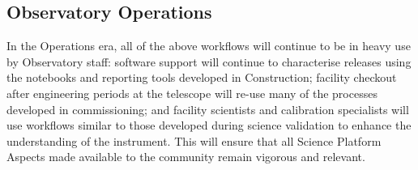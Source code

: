 \subsection{Observatory Operations}\label{observatory-operations}

In the Operations era, all of the above workflows will continue to be in heavy use by Observatory staff: software support will continue to characterise releases using the notebooks and reporting tools developed in Construction; facility checkout after engineering periods at the telescope will re-use many of the processes developed in commissioning; and facility scientists and calibration specialists will use workflows similar to those developed during science validation to enhance the understanding of the instrument. This will ensure that all Science Platform Aspects made available to the community remain vigorous and relevant.
